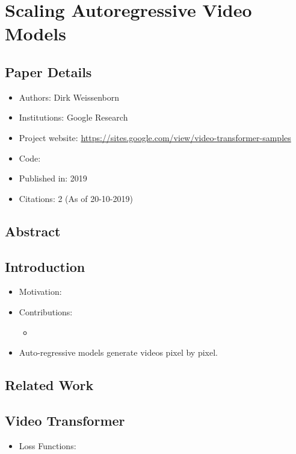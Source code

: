 \documentclass{article}
\begin{document}
    \section{Scaling Autoregressive Video Models}\label{sec:Scaling_Autoregressive_Video_Models}
    \subsection*{Paper Details}
    \begin{itemize}
        \item Authors: Dirk Weissenborn
        \item Institutions: Google Research
        \item Project website: \url{https://sites.google.com/view/video-transformer-samples}
        \item Code:
        \item Published in: 2019
        \item Citations: 2 (As of 20-10-2019)
    \end{itemize}

    \subsection*{Abstract}

    \subsection{Introduction}\label{subsec:Scaling_Autoregressive_Video_Models:introduction}
    \begin{itemize}
        \item Motivation:
        \item Contributions:
        \begin{itemize}
            \item
        \end{itemize}
        \item Auto-regressive models generate videos pixel by pixel.
    \end{itemize}

    \subsection{Related Work}\label{subsec:Scaling_Autoregressive_Video_Models:related-work}

    \subsection{Video Transformer}\label{subsec:Scaling_Autoregressive_Video_Models:video-transformer}
    \begin{itemize}
        \item Loss Functions:
    \end{itemize}
\end{document}
